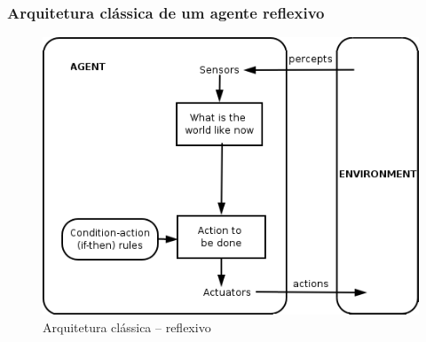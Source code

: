 \begin{frame}

  \frametitle{Arquitetura clássica de um agente reflexivo}
    
\begin{figure}[!ht]
\centering
\includegraphics[width=.6\textwidth]{figuras/agente_reflexivo.png}
\caption{Arquitetura clássica -- reflexivo}
\label{ag_01}
\end{figure}
    
\end{frame}


